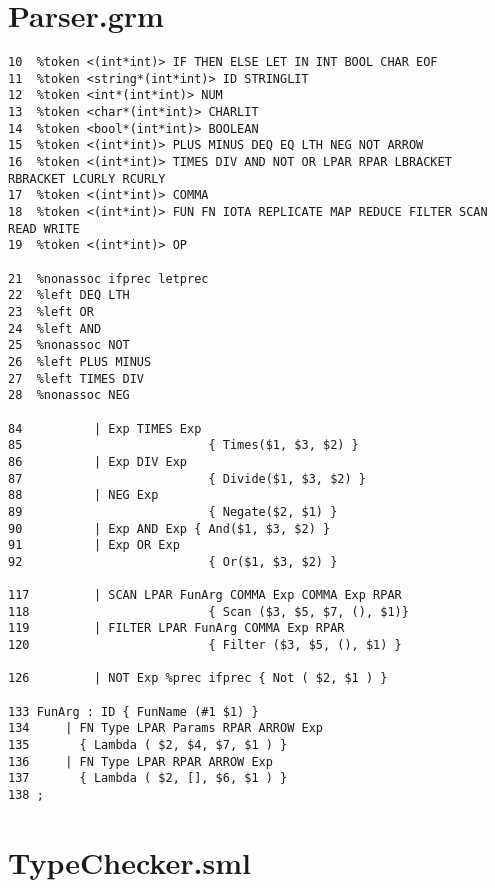 \documentclass[paper=a4, fontsize=11pt]{scrartcl} %
\numberwithin{equation}{section} %
\numberwithin{figure}{section} %
\numberwithin{table}{section} %
\begin{document}
\chapter{Parser.grm}
\begin{lstlisting}
10  %token <(int*int)> IF THEN ELSE LET IN INT BOOL CHAR EOF
11  %token <string*(int*int)> ID STRINGLIT
12  %token <int*(int*int)> NUM
13  %token <char*(int*int)> CHARLIT
14  %token <bool*(int*int)> BOOLEAN
15  %token <(int*int)> PLUS MINUS DEQ EQ LTH NEG NOT ARROW
16  %token <(int*int)> TIMES DIV AND NOT OR LPAR RPAR LBRACKET RBRACKET LCURLY RCURLY
17  %token <(int*int)> COMMA
18  %token <(int*int)> FUN FN IOTA REPLICATE MAP REDUCE FILTER SCAN READ WRITE 
19  %token <(int*int)> OP

21  %nonassoc ifprec letprec
22  %left DEQ LTH
23  %left OR 
24  %left AND
25  %nonassoc NOT
26  %left PLUS MINUS
27  %left TIMES DIV
28  %nonassoc NEG

84          | Exp TIMES Exp  
85                          { Times($1, $3, $2) }
86          | Exp DIV Exp  
87                          { Divide($1, $3, $2) }
88          | NEG Exp  
89                          { Negate($2, $1) }
90          | Exp AND Exp { And($1, $3, $2) }
91          | Exp OR Exp 
92                          { Or($1, $3, $2) }

117	        | SCAN LPAR FunArg COMMA Exp COMMA Exp RPAR 
118	                        { Scan ($3, $5, $7, (), $1)} 
119	        | FILTER LPAR FunArg COMMA Exp RPAR 
120	                        { Filter ($3, $5, (), $1) } 

126	        | NOT Exp %prec ifprec { Not ( $2, $1 ) }   

133	FunArg : ID { FunName (#1 $1) } 
134	    | FN Type LPAR Params RPAR ARROW Exp 
135	      { Lambda ( $2, $4, $7, $1 ) } 
136	    | FN Type LPAR RPAR ARROW Exp 
137	      { Lambda ( $2, [], $6, $1 ) } 
138	;

\end{lstlisting}

\pagebreak
\chapter{TypeChecker.sml}
\end{document}
